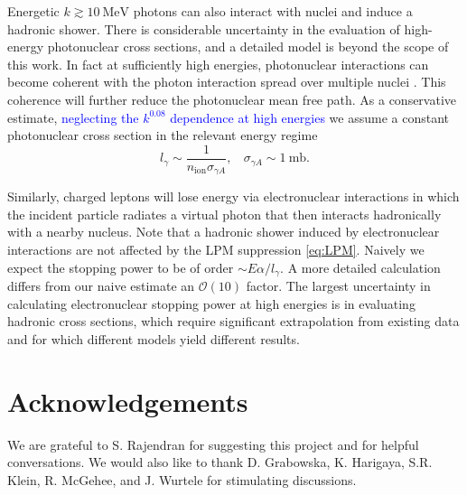 \documentclass[twocolumn,showpacs,preprintnumbers,amsmath,amssymb,prd]{revtex4}
\newcommand{\OO}{\mathcal{O}}
\begin{document}
\begin{appendices}
Energetic $k \gtrsim 10 ~\text{MeV}$ photons can also interact with nuclei and induce a hadronic shower. There is considerable uncertainty in the evaluation of high-energy photonuclear cross sections, and a detailed model is beyond the scope of this work. In fact at sufficiently high energies, photonuclear interactions can become coherent with the photon interaction spread over multiple nuclei \cite{Gerhardt:2010bj}. This coherence will further reduce the photonuclear mean free path. As a conservative estimate, \textcolor{blue}{neglecting the $k^{0.08}$ dependence at high energies} we assume a constant photonuclear cross section in the relevant energy regime
\begin{equation}
l_\gamma \sim \frac{1}{n_\text{ion} \sigma_{\gamma A}}, ~~~~ \sigma_{\gamma A} \sim 1 ~\text{mb}.
\end{equation}

Similarly, charged leptons will lose energy via electronuclear interactions in which the incident particle radiates a virtual photon that then interacts hadronically with a nearby nucleus. Note that a hadronic shower induced by electronuclear interactions are not affected by the LPM suppression \eqref{eq:LPM}. Naively we expect the stopping power to be of order $\sim E \alpha/l_\gamma$. A more detailed calculation \cite{Gerhardt:2010bj} differs from our naive estimate an $\OO(10)$ factor. The largest uncertainty in calculating electronuclear stopping power at high energies is in evaluating hadronic cross sections, which require significant extrapolation from existing data and for which different models yield different results.

\end{appendices}

\section*{Acknowledgements}
We are grateful to S. Rajendran for suggesting this project and for helpful conversations. We would also like to thank D. Grabowska, K. Harigaya, S.R. Klein, R. McGehee, and J. Wurtele for stimulating discussions.


\end{document}
